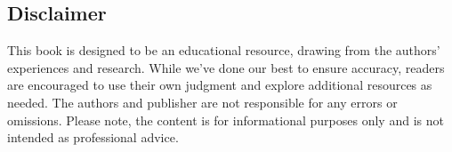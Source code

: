 \documentclass[main.tex]{subfiles}
\begin{document}
\subsection{Disclaimer}
This book is designed to be an educational resource, drawing from the authors' experiences and research. While we've done our best to ensure accuracy, readers are encouraged to use their own judgment and explore additional resources as needed. The authors and publisher are not responsible for any errors or omissions. Please note, the content is for informational purposes only and is not intended as professional advice. \newline
\end{document}
